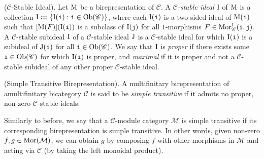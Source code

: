 \noindent\begin{definition}\textup{($\mathscr{C}$-Stable Ideal).} Let $\textup{M}$ be a birepresentation of $\mathscr{C}$. A %
{\em $\mathscr{C}$-stable ideal} $\textup{I}$ of $\textup{M}$ is a collection $\textup{I} \coloneqq \{\textup{I}(\textup{\texttt{i}}) : \textup{\texttt{i}} \in \textup{Ob}(\mathscr{C})\}$, where each $\textup{I}(\textup{\texttt{i}})$ is a %
two-sided ideal of $\textup{M}(\textup{\texttt{i}})$ such that $[\textup{M}(F)](\textup{I}(\textup{\texttt{i}}))$ is a subclass of $\textup{I}(\textup{\texttt{j}})$ for all $1$-morphisms $F \in \textup{Mor}_\mathscr{C}^1(\textup{\texttt{i}}, \textup{\texttt{j}})$. %
A $\mathscr{C}$-stable subideal $\textup{I}$ of a $\mathscr{C}$-stable ideal $\textup{J}$ is a $\mathscr{C}$-stable ideal for which $\textup{I}(\textup{\texttt{i}})$ is a subideal of $\textup{J}(\textup{\texttt{i}})$ for all $\textup{\texttt{i}} \in \textup{Ob}(\mathscr{C})$. We say that $\textup{I}$ is {\em proper} if there exists some $\textup{\texttt{i}} \in \textup{Ob}(\mathscr{C})$ for which $\textup{I}(\textup{\texttt{i}})$ is proper, and {\em maximal} if it is proper and not a $\mathscr{C}$-stable subideal of any other proper $\mathscr{C}$-stable ideal.\\
\end{definition}

\noindent\begin{definition}\textup{(Simple Transitive Birepresentation).} %
A multifinitary birepresentation of a\linebreak multifinitary bicategory $\mathscr{C}$ is said to be {\em simple transitive} if it admits no proper, non-zero $\mathscr{C}$-stable ideals.\\
\end{definition}

\noindent Similarly to before, we say that a $\mathcal{C}$-module category $\mathcal{M}$ is simple transitive if its corresponding birepresentation is simple transitive. In other words, given non-zero $f, g \in \textup{Mor}(\mathcal{M})$, we can obtain $g$ by composing $f$ with other morphisms in $\mathcal{M}$ and acting via $\mathcal{C}$ (by taking the left monoidal product).\\%

